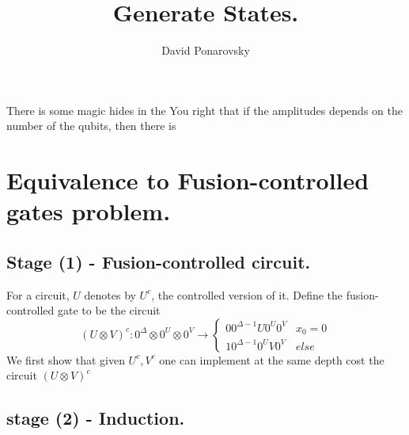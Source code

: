 \documentclass[manuscript,screen,review]{acmart}
\begin{document}


\title{Generate States.} 
\author{David Ponarovsky}

\ifdefined\ACM
\else
  \maketitle
\fi
%
\ifdefined\ACM
  \maketitle
\fi

% 

There is some magic hides in the You right that if the amplitudes depends on the number of the qubits, then there is  

\section{Equivalence to Fusion-controlled gates problem.}
\subsection{Stage (1) - Fusion-controlled circuit.}

For a circuit, $U$ denotes by $U^{c}$, the controlled version of it. Define the fusion-controlled gate to be the circuit 
\begin{equation*} (U\otimes V)^{c} :0^{\Delta}\otimes 0^{U}\otimes 0^{V}   \rightarrow \begin{cases} 0 0^{\Delta -1} U0^{U} 0^{V} & x_{0} = 0\\ 1 0^{\Delta -1} 0^{U} V0^{V} & else \end{cases} 
\end{equation*}
We first show that given $U^{c},V^{c}$ one can implement at the same depth cost the circuit $(U\otimes V)^{c}$

\subsection{stage (2) - Induction.}
\end{document}
